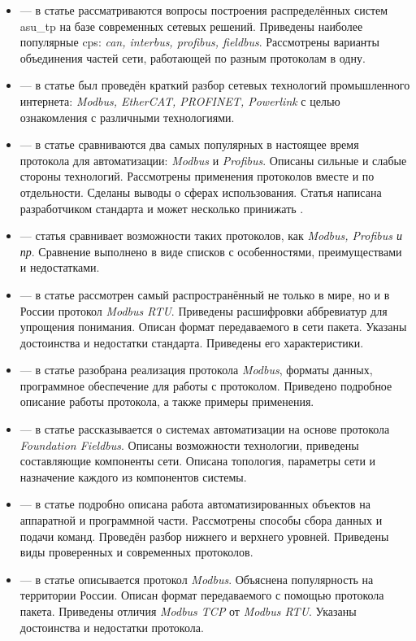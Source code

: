 \begin{itemize}[label=]
	\item \cite{__2002} --- в статье рассматриваются вопросы построения распределённых систем \Gls{asu_tp} на базе современных сетевых решений. Приведены наиболее популярные \Gls{cps}: \textit{can, interbus, profibus, fieldbus}. Рассмотрены варианты объединения частей сети, работающей по разным протоколам в одну. 
	\item \cite{__2018-1} --- в статье был проведён краткий разбор сетевых технологий промышленного интернета: \textit{Modbus, EtherCAT, PROFINET, Powerlink} с целью ознакомления с различными технологиями. 
	\item \cite{powell_profibus_2013} --- в статье сравниваются два самых популярных в настоящее время протокола для автоматизации: \textit{Modbus} и \textit{Profibus}. Описаны сильные и слабые стороны технологий. Рассмотрены применения протоколов вместе и по отдельности. Сделаны выводы о сферах использования. Статья написана разработчиком стандарта \pb и может несколько принижать \mb.
	\item \cite{van_gorp_advanced_2009} --- статья сравнивает возможности таких протоколов, как \textit{Modbus, Profibus и пр}. Сравнение выполнено в виде списков с особенностями, преимуществами и недостатками. 
	\item \cite{_modbus_2021} --- в статье рассмотрен самый распространённый не только в мире, но и в России протокол \textit{Modbus RTU}. Приведены расшифровки аббревиатур для упрощения понимания. Описан формат передаваемого в сети пакета. Указаны достоинства и недостатки стандарта.
	Приведены его характеристики.
	\item \cite{advantech__2019} --- в статье разобрана реализация протокола \textit{Modbus}, форматы данных, программное обеспечение для работы с протоколом. Приведено подробное описание работы протокола, а также примеры применения.
	\item \cite{phoenix_contact__2020} --- в статье рассказывается о системах автоматизации на основе протокола \textit{Foundation Fieldbus}. Описаны возможности технологии, приведены составляющие компоненты сети. Описана топология, параметры сети и назначение каждого из компонентов системы. 
	\item \cite{promwad__2019} --- в статье подробно описана работа автоматизированных объектов на аппаратной и программной части. Рассмотрены способы сбора данных и подачи команд. Проведён разбор нижнего и верхнего уровней. Приведены виды проверенных и современных протоколов. 
	\item \cite{__2010} --- в статье описывается протокол \textit{Modbus}. Объяснена популярность на территории России. Описан формат передаваемого с помощью протокола пакета. Приведены отличия \textit{Modbus TCP} от \textit{Modbus RTU}. Указаны достоинства и недостатки протокола. 

\end{itemize}
